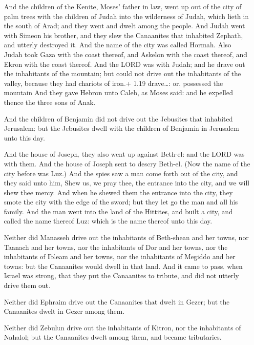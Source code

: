  And the children of the Kenite, Moses' father in law,
went up out of the city of palm trees with the children of Judah into
the wilderness of Judah, which lieth in the south of Arad; and they went
and dwelt among the people.  And Judah went with Simeon his
brother, and they slew the Canaanites that inhabited Zephath, and
utterly destroyed it. And the name of the city was called Hormah.
 Also Judah took Gaza with the coast thereof, and Askelon
with the coast thereof, and Ekron with the coast thereof. 
And the LORD was with Judah; and he drave out the inhabitants of the
mountain; but could not drive out the inhabitants of the valley, because
they had chariots of iron.+ 1.19 drave\ldots: or, possessed the mountain
 And they gave Hebron unto Caleb, as Moses said: and he
expelled thence the three sons of Anak.

 And the children of Benjamin did not drive out the
Jebusites that inhabited Jerusalem; but the Jebusites dwell with the
children of Benjamin in Jerusalem unto this day.

 And the house of Joseph, they also went up against
Beth-el: and the LORD was with them.  And the house of
Joseph sent to descry Beth-el. (Now the name of the city before was
Luz.)  And the spies saw a man come forth out of the city,
and they said unto him, Shew us, we pray thee, the entrance into the
city, and we will shew thee mercy.  And when he shewed them
the entrance into the city, they smote the city with the edge of the
sword; but they let go the man and all his family.  And the
man went into the land of the Hittites, and built a city, and called the
name thereof Luz: which is the name thereof unto this day.

 Neither did Manasseh drive out the inhabitants of
Beth-shean and her towns, nor Taanach and her towns, nor the inhabitants
of Dor and her towns, nor the inhabitants of Ibleam and her towns, nor
the inhabitants of Megiddo and her towns: but the Canaanites would dwell
in that land.  And it came to pass, when Israel was strong,
that they put the Canaanites to tribute, and did not utterly drive them
out.

 Neither did Ephraim drive out the Canaanites that dwelt
in Gezer; but the Canaanites dwelt in Gezer among them.

 Neither did Zebulun drive out the inhabitants of Kitron,
nor the inhabitants of Nahalol; but the Canaanites dwelt among them, and
became tributaries.

